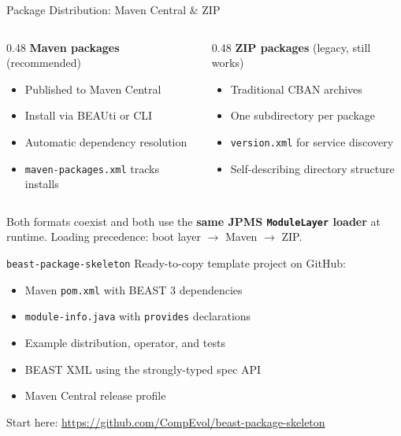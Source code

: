 \documentclass[aspectratio=169,11pt]{beamer}
\newcommand{\code}[1]{\texttt{#1}}
\begin{document}
\begin{frame}{Package Distribution: Maven Central \& ZIP}
\begin{columns}[T]
\begin{column}{0.48\textwidth}
\textbf{Maven packages} (recommended)
\begin{itemize}
\item Published to Maven Central
\item Install via BEAUti or CLI
\item Automatic dependency resolution
\item \code{maven-packages.xml} tracks installs
\end{itemize}
\end{column}
\begin{column}{0.48\textwidth}
\textbf{ZIP packages} (legacy, still works)
\begin{itemize}
\item Traditional CBAN archives
\item One subdirectory per package
\item \code{version.xml} for service discovery
\item Self-describing directory structure
\end{itemize}
\end{column}
\end{columns}

\vspace{1em}
\begin{block}{}
Both formats coexist and both use the \textbf{same JPMS \code{ModuleLayer} loader} at runtime. Loading precedence: boot layer $\to$ Maven $\to$ ZIP.
\end{block}
\end{frame}


\begin{frame}{\code{beast-package-skeleton}}
Ready-to-copy template project on GitHub:

\vspace{0.5em}
\begin{itemize}
\item Maven \code{pom.xml} with BEAST 3 dependencies
\item \code{module-info.java} with \code{provides} declarations
\item Example distribution, operator, and tests
\item BEAST XML using the strongly-typed spec API
\item Maven Central release profile
\end{itemize}

\vspace{1em}
\begin{exampleblock}{}
\centering
Start here: \url{https://github.com/CompEvol/beast-package-skeleton}
\end{exampleblock}
\end{frame}
\end{document}

